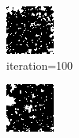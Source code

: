 \documentclass{article}
\begin{document}
\begin{figure}[h]
\begin{subfigure}[t]{0.18\textwidth}
\includegraphics[width=\textwidth]{./computational/results/gibbs_comb_sampler_negative_iter_100.png}
\vspace{-0.6cm}
\caption{iteration=100}
\end{subfigure}\hspace{0.01\textwidth}
\begin{subfigure}[t]{0.18\textwidth}
\centering
\includegraphics[width=\textwidth]{./computational/results/gibbs_comb_sampler_negative_iter_200.png}

\end{subfigure}
\end{figure}
\end{document}
